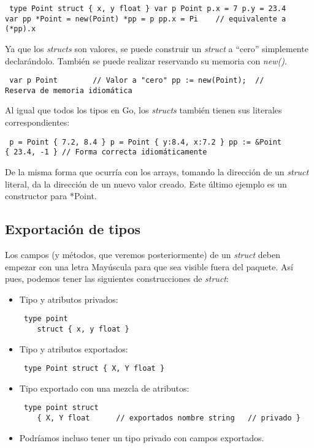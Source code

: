 \begin{verbatim} type Point struct { x, y float } var p Point p.x = 7 p.y = 23.4
var pp *Point = new(Point) *pp = p pp.x = Pi    // equivalente a (*pp).x
\end{verbatim}

Ya que los \textit{structs} son valores, se puede construir un \textit{struct}
a ``cero'' simplemente declarándolo. También se puede realizar reservando su
memoria con \textit{new()}.

\begin{verbatim} var p Point        // Valor a "cero" pp := new(Point);  //
Reserva de memoria idiomática \end{verbatim}

Al igual que todos los tipos en Go, los \textit{structs} también tienen sus
literales correspondientes:

\begin{verbatim} p = Point { 7.2, 8.4 } p = Point { y:8.4, x:7.2 } pp := &Point
{ 23.4, -1 } // Forma correcta idiomáticamente \end{verbatim}

De la misma forma que ocurría con los arrays, tomando la dirección de un
\textit{struct} literal, da la dirección de un nuevo valor creado. Este último
ejemplo es un constructor para *Point.

	\subsection{Exportación de tipos}
	
	Los campos (y métodos, que veremos posteriormente) de un \textit{struct}
	deben empezar con una letra Mayúscula para que sea visible fuera del
	paquete. Así pues, podemos tener las siguientes construcciones de
	\textit{struct}:
	
	\begin{itemize} \item Tipo y atributos privados: \begin{verbatim} type point
	struct { x, y float } \end{verbatim} \item Tipo y atributos exportados:
	\begin{verbatim} type Point struct { X, Y float } \end{verbatim} \item Tipo
	exportado con una mezcla de atributos: \begin{verbatim} type point struct
	{ X, Y float      // exportados nombre string   // privado } \end{verbatim}
	\item Podríamos incluso tener un tipo privado con campos exportados.
	\end{itemize}
	
